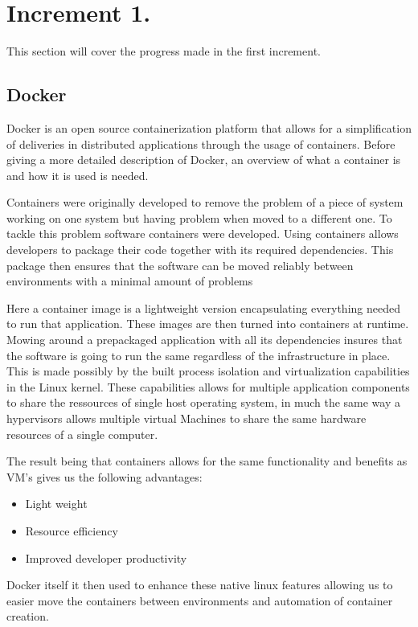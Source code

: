 \section{Increment 1.}
This section will cover the progress made in the first increment. 


\subsection{Docker}
Docker is an open source containerization platform that allows for a simplification of deliveries in distributed applications through the usage of containers. 
Before giving a more detailed description of Docker, an overview of what a container is and how it is used is needed. 


Containers were originally developed to remove the problem of a piece of system working on one system but having problem when moved to a different one. 
To tackle this problem software containers were developed. 
Using containers allows developers to package their code together with its required dependencies. This package then ensures that the software can be moved reliably between environments with a minimal amount of problems


Here a container image is a lightweight version encapsulating everything needed to run that application. These images are then turned into containers at runtime. 
Mowing around a prepackaged application with all its dependencies insures that the software is going to run the same regardless of the infrastructure in place. 
This is made possibly by the built process isolation and virtualization capabilities in the Linux kernel. 
These capabilities allows for multiple application components to share the ressources of single host operating system, 
in much the same way a hypervisors allows multiple virtual Machines to share the same hardware resources of a single computer. 


The result being that containers allows for the same functionality and benefits as VM’s gives us the following advantages:

\begin{itemize}
    \item Light weight 
    \item Resource efficiency
    \item Improved developer productivity
\end{itemize}

Docker itself it then used to enhance these native linux features allowing us to easier move the containers between environments and automation of container creation.

